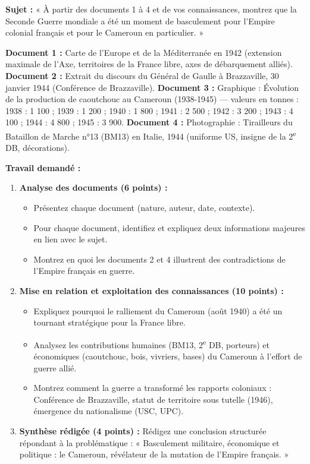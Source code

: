 \documentclass[11pt]{article}
\begin{document}
\begin{exercice}
\textbf{Sujet :} « À partir des documents 1 à 4 et de vos connaissances, montrez que la Seconde Guerre mondiale a été un moment de basculement pour l'Empire colonial français et pour le Cameroun en particulier. »

\textbf{Document 1 :} Carte de l'Europe et de la Méditerranée en 1942 (extension maximale de l'Axe, territoires de la France libre, axes de débarquement alliés).
\textbf{Document 2 :} Extrait du discours du Général de Gaulle à Brazzaville, 30 janvier 1944 (Conférence de Brazzaville).
\textbf{Document 3 :} Graphique : Évolution de la production de caoutchouc au Cameroun (1938-1945) — valeurs en tonnes : 1938 : 1 100 ; 1939 : 1 200 ; 1940 : 1 800 ; 1941 : 2 500 ; 1942 : 3 200 ; 1943 : 4 100 ; 1944 : 4 800 ; 1945 : 3 900.
\textbf{Document 4 :} Photographie : Tirailleurs du Bataillon de Marche n°13 (BM13) en Italie, 1944 (uniforme US, insigne de la 2\textsuperscript{e} DB, décorations).

\textbf{Travail demandé :}
\begin{enumerate}
\item \textbf{Analyse des documents (6 points) :}
\begin{itemize}
\item[a.] Présentez chaque document (nature, auteur, date, contexte).
\item[b.] Pour chaque document, identifiez et expliquez deux informations majeures en lien avec le sujet.
\item[c.] Montrez en quoi les documents 2 et 4 illustrent des contradictions de l'Empire français en guerre.
\end{itemize}
\item \textbf{Mise en relation et exploitation des connaissances (10 points) :}
\begin{itemize}
\item[a.] Expliquez pourquoi le ralliement du Cameroun (août 1940) a été un tournant stratégique pour la France libre.
\item[b.] Analysez les contributions humaines (BM13, 2\textsuperscript{e} DB, porteurs) et économiques (caoutchouc, bois, vivriers, bases) du Cameroun à l'effort de guerre allié.
\item[c.] Montrez comment la guerre a transformé les rapports coloniaux : Conférence de Brazzaville, statut de territoire sous tutelle (1946), émergence du nationalisme (USC, UPC).
\end{itemize}
\item \textbf{Synthèse rédigée (4 points) :} Rédigez une conclusion structurée répondant à la problématique : « Basculement militaire, économique et politique : le Cameroun, révélateur de la mutation de l'Empire français. »
\end{enumerate}
\end{exercice}
\end{document}
